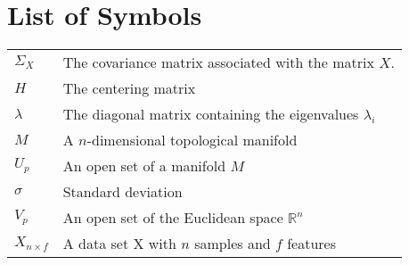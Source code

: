 \chapter*{List of Symbols}

\begin{table}[htbp]
	\begin{tabularx}{\textwidth}{XX}
		$\Sigma_X$ 		    & The covariance matrix associated with the matrix $X$. \bigstrut\\
		$H$ 						   & The centering matrix \bigstrut \\
		$\lambda$ 			  & The diagonal matrix containing the eigenvalues $\lambda_i$ \bigstrut\\
		$M$ 						  & A $n$-dimensional topological manifold \bigstrut\\
		$U_p$ 						& An open set of a manifold $M$ \bigstrut\\
		$\sigma$ 				& Standard deviation \bigstrut\\
		$V_p$ 						& An open set of the Euclidean space $\mathbb{R}^n$ \bigstrut\\
		$X_{n \times f}$  & A data set X with $n$ samples and $f$ features \bigstrut\\
	\end{tabularx}
\end{table}
